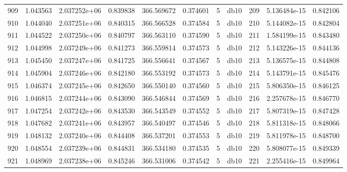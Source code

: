 \begin{tabular}{lrrrrrrlrrr}
909  &    1.043563 &        2.037252e+06 &  0.839838 &              366.569672 &    0.374601 &       5 &         db10 &    209 &   5.136484e-15 &      0.842106 \\
910  &    1.044040 &        2.037251e+06 &  0.840315 &              366.566528 &    0.374584 &       5 &         db10 &    210 &   5.144082e-15 &      0.842804 \\
911  &    1.044522 &        2.037250e+06 &  0.840797 &              366.563110 &    0.374590 &       5 &         db10 &    211 &   1.584199e-15 &      0.843480 \\
912  &    1.044998 &        2.037249e+06 &  0.841273 &              366.559814 &    0.374573 &       5 &         db10 &    212 &   5.143226e-15 &      0.844136 \\
913  &    1.045450 &        2.037247e+06 &  0.841725 &              366.556641 &    0.374567 &       5 &         db10 &    213 &   5.136575e-15 &      0.844808 \\
914  &    1.045904 &        2.037246e+06 &  0.842180 &              366.553192 &    0.374573 &       5 &         db10 &    214 &   5.143791e-15 &      0.845476 \\
915  &    1.046374 &        2.037245e+06 &  0.842650 &              366.550140 &    0.374560 &       5 &         db10 &    215 &   5.806350e-15 &      0.846125 \\
916  &    1.046815 &        2.037244e+06 &  0.843090 &              366.546844 &    0.374569 &       5 &         db10 &    216 &   2.257678e-15 &      0.846770 \\
917  &    1.047254 &        2.037242e+06 &  0.843530 &              366.543549 &    0.374552 &       5 &         db10 &    217 &   5.807319e-15 &      0.847428 \\
918  &    1.047682 &        2.037241e+06 &  0.843957 &              366.540497 &    0.374546 &       5 &         db10 &    218 &   5.811318e-15 &      0.848066 \\
919  &    1.048132 &        2.037240e+06 &  0.844408 &              366.537201 &    0.374553 &       5 &         db10 &    219 &   5.811978e-15 &      0.848700 \\
920  &    1.048554 &        2.037239e+06 &  0.844831 &              366.534180 &    0.374535 &       5 &         db10 &    220 &   5.808077e-15 &      0.849339 \\
921  &    1.048969 &        2.037238e+06 &  0.845246 &              366.531006 &    0.374542 &       5 &         db10 &    221 &   2.255416e-15 &      0.849964 \\

\end{tabular}
